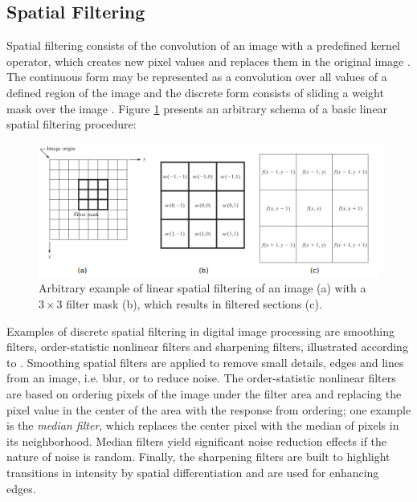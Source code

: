 \subsection{Spatial Filtering}

Spatial filtering consists of the convolution of an image with a predefined kernel operator, which creates new pixel values and replaces them in the original image \cite{gonzalez2018digital}. The continuous form may be represented as a convolution over all values of a defined region of the image and the discrete form consists of sliding a weight mask over the image \cite{wu2008microscope}. Figure \ref{fig:generic_spatial_filtering} presents an arbitrary schema of a basic linear spatial filtering procedure:

\begin{figure}[htb]
	\centering
	\caption{\label{fig:generic_spatial_filtering} Arbitrary example of linear spatial filtering of an image (a) with a $3 \times 3$ filter mask (b), which results in filtered sections (c).} 
	\begin{center}
	    \includegraphics[scale=0.4]{images/generic_spatial_filtering.png}
	\end{center}
	\centering
\end{figure}

Examples of discrete spatial filtering in digital image processing are smoothing filters, order-statistic nonlinear filters and sharpening filters, illustrated according to \cite{gonzalez2018digital}. Smoothing spatial filters are applied to remove small details, edges and lines from an image, i.e. blur, or to reduce noise. The order-statistic nonlinear filters are based on ordering pixels of the image under the filter area and replacing the pixel value in the center of the area with the response from ordering; one example is the \emph{median filter}, which replaces the center pixel with the median of pixels in its neighborhood. Median filters yield significant noise reduction effects if the nature of noise is random. Finally, the sharpening filters are built to highlight transitions in intensity by spatial differentiation and are used for enhancing edges.

